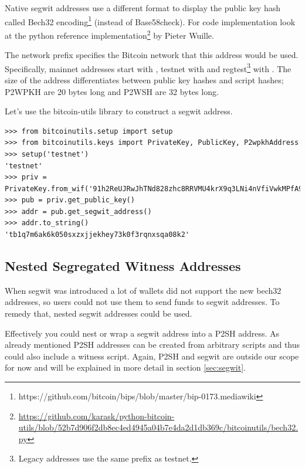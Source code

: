 Native segwit addresses use a different format to display the public key hash called Bech32 encoding\footnote{https://github.com/bitcoin/bips/blob/master/bip-0173.mediawiki} (instead of Base58check). For code implementation look at the python reference implementation\footnote{\url{https://github.com/karask/python-bitcoin-utils/blob/52b7d906f2db8ec4ed4945a04b7e4da2d1db369c/bitcoinutils/bech32.py}} by Pieter Wuille.

The network prefix specifies the Bitcoin network that this address would be used. Specifically, mainnet addresses start with , testnet with  and regtest\footnote{Legacy addresses use the same prefix as testnet.} with . The size of the address differentiates between public key hashes and script hashes; P2WPKH are 20 bytes long and P2WSH are 32 bytes long.

Let's use the bitcoin-utils library to construct a segwit address.

\vspace{1em}
\begin{lstlisting}[style=Python,label={lst:display-segwit-address},caption={Example of displaying a segwit address from a public key using Python},captionpos=b]
>>> from bitcoinutils.setup import setup
>>> from bitcoinutils.keys import PrivateKey, PublicKey, P2wpkhAddress
>>> setup('testnet')
'testnet' 
>>> priv = PrivateKey.from_wif('91h2ReUJRwJhTNd828zhc8RRVMU4krX9q3LNi4nVfiVwkMPfA9p')
>>> pub = priv.get_public_key()  
>>> addr = pub.get_segwit_address()
>>> addr.to_string() 
'tb1q7m6ak6k050sxzxjjekhey73k0f3rqnxsqa08k2'
\end{lstlisting}
\vspace{1em}



\subsection*{Nested Segregated Witness Addresses}

When segwit was introduced a lot of wallets did not support the new bech32 addresses, so users could not use them to send funds to segwit addresses. To remedy that, nested segwit addresses could be used.

Effectively you could nest or wrap a segwit address into a P2SH address. As already mentioned P2SH addresses can be created from arbitrary scripts and thus could also include a witness script. Again, P2SH and segwit are outside our scope for now and will be explained in more detail in section \ref{sec:segwit}.

